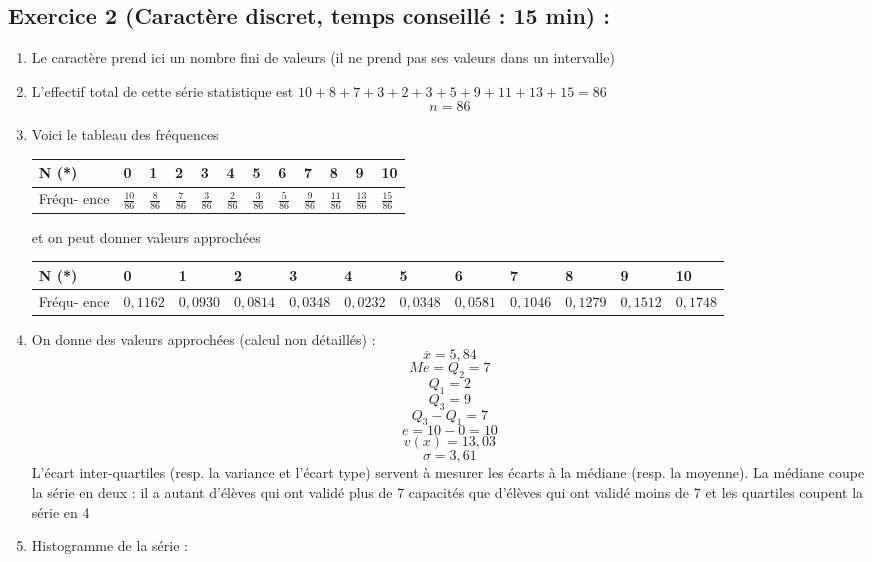 \subsection*{Exercice 2 (Caractère discret, temps conseillé : 15 min) : }
\begin{enumerate}
\item Le caractère prend ici un nombre fini de valeurs (il ne prend pas ses valeurs dans un intervalle)
\item L'effectif total de cette série statistique est $10 + 8 + 7 + 3 + 2 + 3 + 5 + 9 +11 +13 +15 = 86$ $$\boxed{n=86}$$ 
\item Voici le tableau des fréquences\newline
\begin{tabularx}{\linewidth}{|X|X|X|X|X|X|X|X|X|X|X|X|}
\hline
N (*) & 0 & 1 & 2 & 3 & 4 & 5 & 6 & 7 & 8 & 9 & 10\\ \hline
Fréqu-
ence & $\frac{10}{86}$ & $\frac{8}{86}$ & $\frac{7}{86}$ & $\frac{3}{86}$ & $\frac{2}{86}$ & $\frac{3}{86}$ & $\frac{5}{86}$ & $\frac{9}{86}$ & $\frac{11}{86}$ & $\frac{13}{86}$ & $\frac{15}{86}$ \\ \hline
\end{tabularx}\newline
et on peut donner valeurs approchées \newline
\begin{tabularx}{\linewidth}{|X|X|X|X|X|X|X|X|X|X|X|X|}
\hline
N (*) & 0 & 1 & 2 & 3 & 4 & 5 & 6 & 7 & 8 & 9 & 10\\ \hline
Fréqu-
ence & $0,1162$ & $0,0930$ &$0,0814$ & $0,0348$ & $0,0232$ & $0,0348$ & $0,0581$ & $0,1046$ & $0,1279$ & $0,1512$ & $0,1748$ \\ \hline
\end{tabularx}\newline
\item On donne des valeurs approchées (calcul non détaillés) : 
$$\boxed{\overline{x} = 5,84}$$
$$\boxed{Me = Q_2 = 7}$$
$$\boxed{Q_1 = 2}$$
$$\boxed{Q_3 = 9}$$
$$\boxed{Q_3 - Q_1 = 7}$$
$$\boxed{e = 10-0 = 10}$$
$$\boxed{v(x) = 13,03}$$
$$\boxed{\sigma = 3,61}$$
L'écart inter-quartiles (resp. la variance et l'écart type) servent à mesurer les écarts à la médiane (resp. la moyenne). La médiane coupe la série en deux : il a autant d'élèves qui ont validé plus de 7 capacités que d'élèves qui ont validé moins de 7 et les quartiles coupent la série en 4
\item Histogramme de la série : \newline

\end{enumerate}
